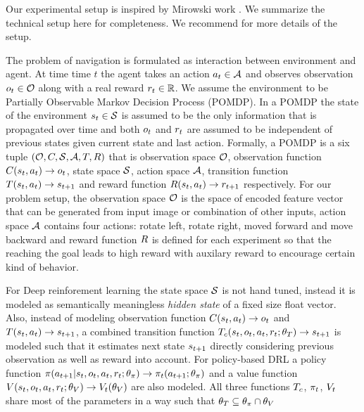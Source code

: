 Our experimental setup is inspired by Mirowski \etal{} work \cite{MiPaViICLR2017}. We summarize the technical setup here for completeness. We recommend \cite{MnBaMiICML2016,MnBaMiICML2016,MiPaViICLR2017} for more details of the setup.

The problem of navigation is formulated as interaction between environment and agent. At time time $t$ the agent takes an action $a_t \in \mathcal{A}$ and observes observation $o_t \in \mathcal{O}$ along with a real reward $r_t \in \mathbb{R}$.
We assume the environment to be Partially Observable Markov Decision Process (POMDP).
In a POMDP the state of the environment $s_t \in \mathcal{S}$ is assumed to be the only information that is propagated over time and both $o_t$ and $r_t$ are assumed to be independent of previous states given current state and last action. Formally, a POMDP is a six tuple $(\mathcal{O}, C, \mathcal{S}, \mathcal{A}, T, R)$ that is observation space $\mathcal{O}$, observation function $C(s_t, a_t) \rightarrow o_t$, state space $\mathcal{S}$, action space $\mathcal{A}$, transition function $T(s_t, a_t) \rightarrow s_{t+1}$ and reward function $R(s_t, a_t) \rightarrow r_{t+1}$ respectively.
For our problem setup, the observation space $\mathcal{O}$ is the space of encoded feature vector that can be generated from input image or combination of other inputs, action space $\mathcal{A}$ contains four actions: rotate left, rotate right, moved forward and move backward and reward function $R$ is defined for each experiment so that the reaching the goal leads to high reward with auxilary reward to encourage certain kind of behavior.

For Deep reinforement learning the state space $\mathcal{S}$ is not hand tuned, instead it is modeled as semantically meaningless \emph{hidden state} of a fixed size float vector.
Also, instead of modeling observation function $C(s_t, a_t) \rightarrow o_t$ and $T(s_t, a_t) \rightarrow s_{t+1}$, a combined transition function $T_c(s_t, o_t, a_t, r_t; \theta_T) \rightarrow s_{t+1}$ is modeled such that it estimates next state $s_{t+1}$ directly considering previous observation as well as reward into account. For policy-based DRL a policy function $\pi(a_{t+1}|s_t, o_t, a_t, r_t; \theta_\pi) \rightarrow \pi_t(a_{t+1} ; \theta_\pi)$ and a value function $V(s_t, o_t, a_t, r_t; \theta_V) \rightarrow V_t(\theta_V)$ are also modeled. All three functions $T_c$, $\pi_t$, $V_t$ share most of the parameters in a way such that $\theta_T \subseteq \theta_{\pi} \cap \theta_V$

